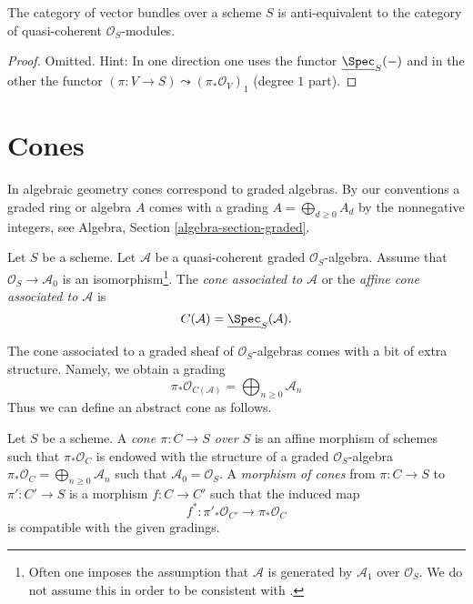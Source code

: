 \begin{lemma}
\label{lemma-category-vector-bundles}
The category of vector bundles over a scheme $S$ is
anti-equivalent to the category of quasi-coherent $\mathcal{O}_S$-modules.
\end{lemma}

\begin{proof}
Omitted. Hint: In one direction one uses the functor
$\underline{\Spec}_S(-)$ and in the other the functor
$(\pi : V \to S) \leadsto (\pi_*\mathcal{O}_V)_1$ (degree $1$ part).
\end{proof}




\section{Cones}
\label{section-cone}

\noindent
In algebraic geometry cones correspond to graded algebras. By our conventions
a graded ring or algebra $A$ comes with a grading
$A = \bigoplus_{d \geq 0} A_d$ by the nonnegative integers, see
Algebra, Section \ref{algebra-section-graded}.

\begin{definition}
\label{definition-cone}
Let $S$ be a scheme. Let $\mathcal{A}$ be a quasi-coherent
graded $\mathcal{O}_S$-algebra. Assume that $\mathcal{O}_S \to \mathcal{A}_0$
is an isomorphism\footnote{Often one imposes the assumption that
$\mathcal{A}$ is generated by $\mathcal{A}_1$ over $\mathcal{O}_S$. We do not
assume this in order to be consistent with \cite[II, (8.3.1)]{EGA}.}.
The {\it cone associated to $\mathcal{A}$} or the
{\it affine cone associated to $\mathcal{A}$}
is
$$
C(\mathcal{A}) = \underline{\Spec}_S(\mathcal{A}).
$$
\end{definition}

\noindent
The cone associated to a graded sheaf of $\mathcal{O}_S$-algebras
comes with a bit of extra structure. Namely, we obtain a grading
$$
\pi_*\mathcal{O}_{C(\mathcal{A})} =
\bigoplus\nolimits_{n \geq 0} \mathcal{A}_n
$$
Thus we can define an abstract cone as follows.

\begin{definition}
\label{definition-abstract-cone}
Let $S$ be a scheme. A {\it cone $\pi : C \to S$ over $S$} is an
affine morphism of schemes such that $\pi_*\mathcal{O}_C$ is endowed with
the structure of a graded $\mathcal{O}_S$-algebra
$\pi_*\mathcal{O}_C = \bigoplus\nolimits_{n \geq 0} \mathcal{A}_n$
such that $\mathcal{A}_0 = \mathcal{O}_S$. A {\it morphism of cones}
from $\pi : C \to S$ to $\pi' : C' \to S$
is a morphism $f : C \to C'$ such that the induced map
$$
f^* : \pi'_*\mathcal{O}_{C'} \longrightarrow \pi_*\mathcal{O}_C
$$
is compatible with the given gradings.
\end{definition}

